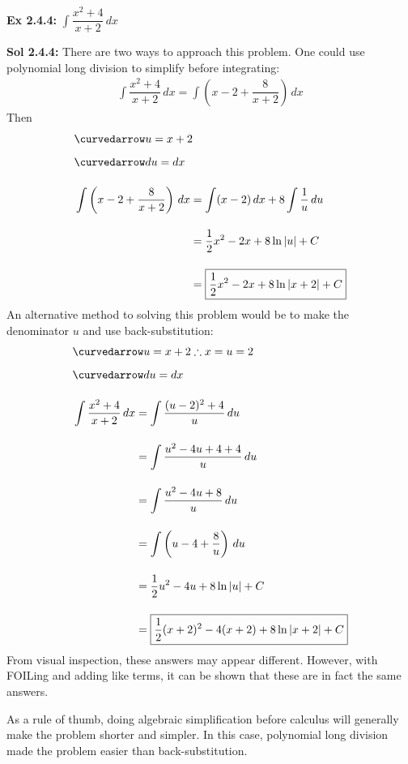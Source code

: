 \begin{tcolorbox}[example]
    \textbf{Ex 2.4.4: } $\int \dfrac{x^2 + 4}{x + 2} \, dx$
\end{tcolorbox}
\begin{tcolorbox}[solution]
    \textbf{Sol 2.4.4: } There are two ways to approach this problem. One could use polynomial long division to simplify before integrating: \begin{align*}
        \int \dfrac{x^2 + 4}{x + 2} \, dx = \int \left(x - 2 + \dfrac{8}{x + 2}\right) \, dx
    \end{align*}
    Then \begin{align*}
        & \curvedarrow u = x + 2 \\[5.5pt]
        & \curvedarrow du = dx \\[11pt]
        & \int \left(x - 2 + \dfrac{8}{x + 2}\right) \, dx \begin{aligned}[t]
            & = \int (x - 2) \, dx + 8\int \dfrac{1}{u} \, du \\[11pt]
            & = \dfrac{1}{2}x^2 - 2x + 8\ln |u| + C \\[11pt]
            & = \boxed{\dfrac{1}{2}x^2 - 2x + 8\ln |x + 2| + C}
        \end{aligned}
    \end{align*}
    An alternative method to solving this problem would be to make the denominator $u$ and use back-substitution: \begin{align*}
        & \curvedarrow u = x + 2 \therefore x = u = 2 \\[5.5pt]
        & \curvedarrow du = dx \\[11pt]
        & \int \dfrac{x^2 + 4}{x + 2} \, dx \begin{aligned}[t]
            & = \int \dfrac{(u - 2)^2 + 4}{u} \, du \\[11pt]
            & = \int \dfrac{u^2 - 4u + 4 + 4}{u} \, du \\[11pt]
            & = \int \dfrac{u^2 - 4u + 8}{u} \, du \\[11pt]
            & = \int \left(u - 4 + \dfrac{8}{u}\right) \, du \\[11pt]
            & = \dfrac{1}{2}u^2 - 4u + 8\ln |u| + C \\[11pt]
            & = \boxed{\dfrac{1}{2}(x + 2)^2 - 4(x + 2) + 8\ln |x + 2| + C}
        \end{aligned}
    \end{align*}
    From visual inspection, these answers may appear different. However, with FOILing and adding like terms, it can be shown that these are in fact the same answers. \par
    \vspace{11pt}
    As a rule of thumb, doing algebraic simplification before calculus will generally make the problem shorter and simpler. In this case, polynomial long division made the problem easier than back-substitution.
\end{tcolorbox}

